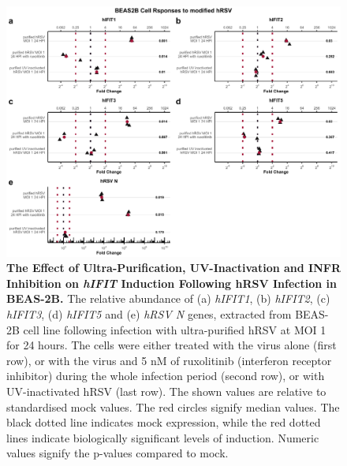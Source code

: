 \begin{figure}
    \centering
    \includegraphics[width=1\linewidth]{06. Chapter 1/Figs/01. Induction/10. beas2b_hrsv.pdf}
    \caption[The Effect of Ultra-Purification, UV-Inactivation and INFR Inhibition on \textit{hIFIT} Induction Following hRSV Infection in BEAS-2B.]{\textbf{The Effect of Ultra-Purification, UV-Inactivation and INFR Inhibition on \textit{hIFIT} Induction Following hRSV Infection in BEAS-2B.} The relative abundance of (a) \textit{hIFIT1}, (b) \textit{hIFIT2}, (c) \textit{hIFIT3}, (d) \textit{hIFIT5} and (e) \textit{hRSV N} genes, extracted from BEAS-2B cell line following infection with ultra-purified hRSV at MOI 1 for 24 hours. The cells were either treated with the virus alone (first row), or with the virus and 5 nM of ruxolitinib (interferon receptor inhibitor) during the whole infection period (second row), or with UV-inactivated hRSV (last row). The shown values are relative to standardised mock values. The red circles signify median values. The black dotted line indicates mock expression, while the red dotted lines indicate biologically significant levels of induction. Numeric values signify the p-values compared to mock.}
    \label{The effect of ultra-purification, UV-inactivation and INFR inhibition on hIFIT induction following hRSV infection in BEAS-2B}
\end{figure}


